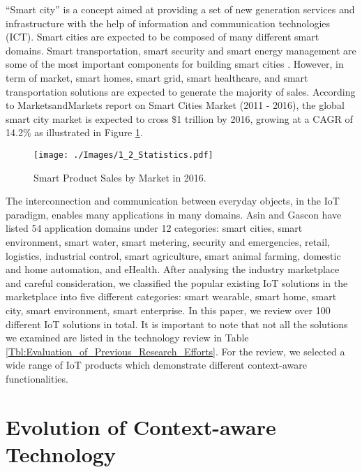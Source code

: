 \documentclass[journal]{IEEEtran}
\begin{document}
 ``Smart city'' \cite{P532} is a concept aimed at providing a set of new generation services and infrastructure with the help of information and communication technologies (ICT). Smart cities are expected to be composed of many different smart domains. Smart transportation, smart security and smart energy management are some of the most important components for building smart cities \cite{TII04}. However, in term of market, smart homes, smart grid, smart healthcare, and smart transportation solutions are expected to generate the majority of sales.  According to MarketsandMarkets report on Smart Cities Market (2011 - 2016), the global smart city market is expected to cross \$1 trillion by 2016, growing at a CAGR of 14.2\% as illustrated in Figure \ref{Figure:Statistics1}. 



\begin{figure}[!h]
 \centering
\texttt{[image: ./Images/1\_2\_Statistics.pdf]}
\caption{Smart Product Sales by Market in 2016.}
 \label{Figure:Statistics1}	
\end{figure}






The interconnection and communication between everyday objects, in the IoT paradigm, enables many applications in many domains. Asin and Gascon \cite{WaspMote} have listed 54 application domains under 12 categories: smart cities, smart environment, smart water, smart metering, security and emergencies, retail, logistics, industrial control, smart agriculture, smart animal farming, domestic and home automation, and eHealth. After analysing the industry marketplace and careful consideration, we classified the popular existing IoT solutions in the marketplace into five different categories: smart wearable, smart home, smart city, smart environment, smart enterprise. In this paper, we review  over 100 different IoT solutions in total. It is important to note that not all the solutions we examined are listed in the technology review in Table \ref{Tbl:Evaluation_of_Previous_Research_Efforts}. For the review, we selected a wide range of IoT products which demonstrate different context-aware functionalities.










 \section{Evolution of Context-aware Technology}
 \label{sec:Evolution}
 
\end{document}
